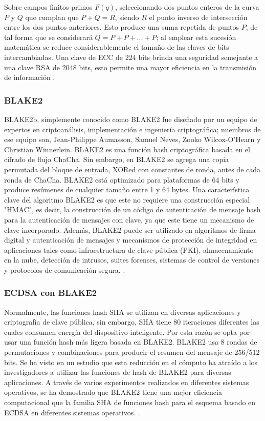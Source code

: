 \documentclass{article}
\begin{document}
                Sobre campos finitos primos $F(q)$, seleccionando dos puntos enteros de la curva $P$ y $Q$ que cumplan que $P+Q=R$, siendo $R$ el punto inverso de intersección entre los dos puntos anteriores. Esto produce una suma repetida de puntos $P$, de tal forma que se considerará $Q=P+P+...+P$; al emplear esta sucesión matemática se reduce considerablemente el tamaño de las claves de bits intercambiadas. Una clave de ECC de 224 bits brinda una seguridad semejante a una clave RSA de 2048 bits, esto permite una mayor eficiencia en la transmisión de información \cite{sanchez2021solucion}.

            \subsubsection{BLAKE2}

                BLAKE2b, simplemente conocido como BLAKE2 fue diseñado por un equipo de expertos en criptoanálisis, implementación e ingeniería criptográfica; miembros de ese equipo son, Jean-Philippe Aumasson, Samuel Neves, Zooko Wilcox-O'Hearn y Christian Winnerlein. BLAKE2 es una función hash criptográfica basada en el cifrado de flujo ChaCha. Sin embargo, en BLAKE2 se agrega una copia permutada del bloque de entrada, XORed con constantes de ronda, antes de cada ronda de ChaCha. BLAKE2 está optimizado para plataformas de 64 bits y produce resúmenes de cualquier tamaño entre 1 y 64 bytes. Una característica clave del algoritmo BLAKE2 es que este no requiere una construcción especial "HMAC", es decir, la construcción de un código de autenticación de mensaje hash para la autenticación de mensajes con clave, ya que este tiene un mecanismo de clave incorporado. Además, BLAKE2 puede ser utilizado en algoritmos de firma digital y autenticación de mensajes y mecanismos de protección de integridad en aplicaciones tales como infraestructura de clave pública (PKI), almacenamiento en la nube, detección de intrusos, suites forenses, sistemas de control de versiones y protocolos de comunicación segura. \cite{BLAKE2_2017}.

            \subsubsection{ECDSA con BLAKE2}

                Normalmente, las funciones hash SHA se utilizan en diversas aplicaciones y criptografía de clave pública, sin embargo, SHA tiene 80 iteraciones diferentes las cuales consumen energía del dispositivo inteligente. Por esta razón se opta por usar una función hash más ligera basada en BLAKE2.  BLAKE2 usa 8 rondas de permutaciones y combinaciones para producir el resumen del mensaje de 256/512 bits. Se ha visto en un estudio que esta reducción en el cómputo ha atraído a los investigadores a utilizar las funciones de hash de BLAKE2 para diversas aplicaciones. A través de varios experimentos realizados en diferentes sistemas operativos, se ha demostrado que BLAKE2 tiene una mejor eficiencia computacional que la familia SHA de funciones hash para el esquema basado en ECDSA en diferentes sistemas operativos. \cite{9031038}.
\end{document}
